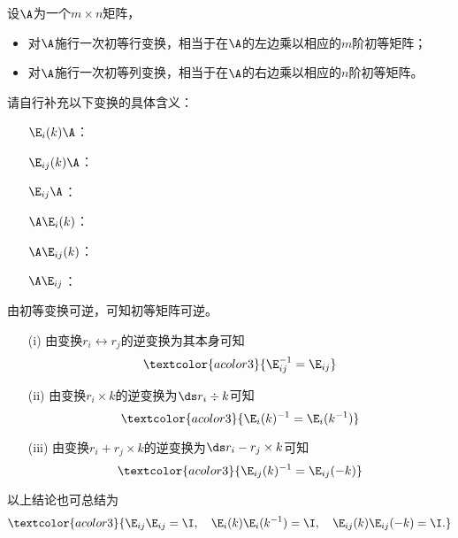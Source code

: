 \begin{frame}\ft{\secname}
%
\begin{dingli}
  设$\A$为一个$m\times n$矩阵，
  \begin{itemize}
  \item 
    对$\A$施行一次初等行变换，相当于在$\A$的左边乘以相应的$m$阶初等矩阵；
  \item
    对$\A$施行一次初等列变换，相当于在$\A$的右边乘以相应的$n$阶初等矩阵。
  \end{itemize}
\end{dingli}
\end{frame}


\begin{frame}\ft{\secname}
\begin{lianxi}
  请自行补充以下变换的具体含义：
  \begin{itemize}
  \item[] $\E_i(k)\A$：
  \item[] $\E_{ij}(k)\A$：
  \item[] $\E_{ij}\A$：
  \item[] $\A\E_i(k)$：
  \item[] $\A\E_{ij}(k)$：
  \item[] $\A\E_{ij}$：
  \end{itemize}
\end{lianxi}
\end{frame}


\begin{frame}\ft{\secname}
由初等变换可逆，可知初等矩阵可逆。  
\begin{itemize}
\item[(i)] 由\textcolor{acolor1}{变换$r_i\leftrightarrow r_j$的逆变换为其本身}可知
  $$
  \textcolor{acolor3}{\E_{ij}^{-1} = \E_{ij}}
  $$ 
\item[(ii)] 由\textcolor{acolor1}{变换$r_i\times k$的逆变换为$\ds r_i\div k$}可知
  $$
  \textcolor{acolor3}{\E_{i}(k)^{-1} = \E_{i}(k^{-1})}
  $$ 
\item[(iii)] 由\textcolor{acolor1}{变换$r_i+r_j\times k$的逆变换为$\ds r_i-r_j\times k$}可知
  $$
  \textcolor{acolor3}{\E_{ij}(k)^{-1} = \E_{ij}(-k)}
  $$ 
\end{itemize}
\end{frame}


\begin{frame}\ft{\secname}
以上结论也可总结为
  $$ \textcolor{acolor3}{
    \E_{ij}\E_{ij}=\I, \quad
    \E_{i}(k)\E_{i}(k^{-1}) = \I, \quad
    \E_{ij}(k)\E_{ij}(-k) = \I.
  }
  $$      
\end{frame}


